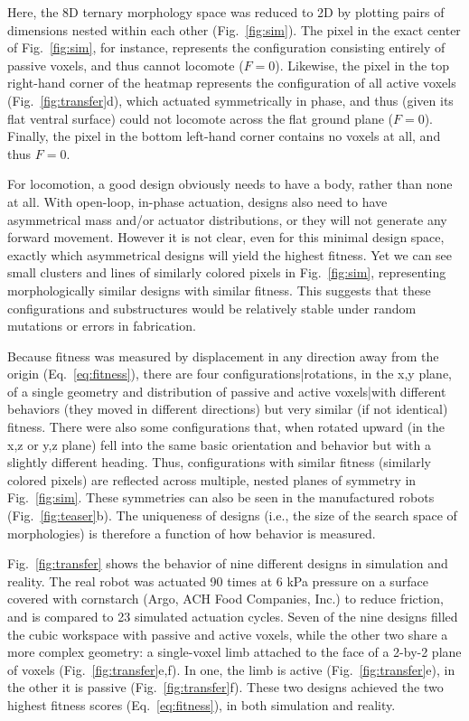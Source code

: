 


Here, the 8D ternary morphology space was reduced to 2D by plotting pairs of dimensions nested within each other (Fig.~\ref{fig:sim}).
The pixel in the exact center of Fig.~\ref{fig:sim}, for instance, represents the configuration consisting entirely of passive voxels, and thus cannot locomote ($F=0$).
Likewise, the pixel in the top right-hand corner of the heatmap represents the configuration of all active voxels (Fig.~\ref{fig:transfer}d), which actuated symmetrically in phase, and thus (given its flat ventral surface) could not locomote across the flat ground plane ($F=0$).
Finally, the pixel in the bottom left-hand corner contains no voxels at all, and thus $F=0$.


For locomotion, a good design obviously needs to have a body, rather than none at all.
With open-loop, in-phase actuation, designs also need to have asymmetrical mass and/or actuator distributions, or they will not generate any forward movement.
However it is not clear, even for this minimal design space, exactly which asymmetrical designs will yield the highest fitness.
Yet we can see small clusters and lines of similarly colored pixels in Fig.~\ref{fig:sim}, representing morphologically similar designs with similar fitness.
This suggests that these configurations and substructures would be relatively stable under random mutations or errors in fabrication.


Because fitness was measured by displacement in any direction away from the origin (Eq.~\ref{eq:fitness}), there are four configurations|rotations, in the x,y plane, of a single geometry and distribution of passive and active voxels|with different behaviors (they moved in different directions) but very similar (if not identical) fitness.
There were also some configurations that, when rotated upward (in the x,z or y,z plane) fell into the same basic orientation and behavior but with a slightly different heading.
Thus, configurations with similar fitness (similarly colored pixels) are reflected across multiple, nested planes of symmetry in Fig.~\ref{fig:sim}.
These symmetries can also be seen in the manufactured robots (Fig.~\ref{fig:teaser}b).
The uniqueness of designs (i.e., the size of the search space of morphologies) is therefore a function of how behavior is measured.

 



Fig.~\ref{fig:transfer} shows the behavior of nine different designs in simulation and reality.
The real robot was actuated 90 times at 6 kPa pressure on a surface covered with cornstarch 
(Argo\textregistered, ACH Food Companies, Inc.) 
to reduce friction, and is compared to 23 simulated actuation cycles.
Seven of the nine designs filled the cubic workspace with passive and active voxels, while the other two share a more complex geometry: a single-voxel limb attached to the face of a 2-by-2 plane of voxels (Fig.~\ref{fig:transfer}e,f).
In one, the limb is active (Fig.~\ref{fig:transfer}e), in the other it is passive (Fig.~\ref{fig:transfer}f).
These two designs achieved the two highest fitness scores (Eq.~\ref{eq:fitness}), in both simulation and reality.

